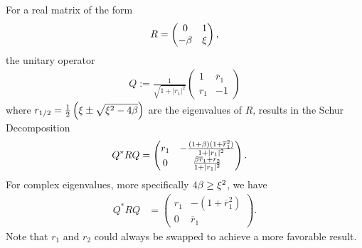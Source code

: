 \begin{lemma}
	For a real matrix of the form
	\begin{align*}
		R = \begin{pmatrix}
			0 & 1 \\
			-\beta & \xi
		\end{pmatrix},
	\end{align*}
	the unitary operator	
	\begin{align*}
		Q:=\frac{1}{\sqrt{1+|r_1|^2}} \begin{pmatrix}
		1 & \overline{r}_1 \\
		r_1 & -1
	\end{pmatrix}
	\end{align*}
	where
	\(
		r_{1/2}
		= \tfrac12 \left(
			\xi \pm \sqrt{\xi^2 - 4\beta}
		\right)
	\)
	are the eigenvalues of \(R\), results in the Schur Decomposition
	\begin{align*}
		Q^* R Q
		&=\begin{pmatrix}
			r_1
			& -\frac{(1+\beta)(1+\overline{r}_1^2)}{1+|r_1|^2} \\
			0 &  \frac{\beta\overline{r}_1 + r_2}{1+|r_1|^2}
		\end{pmatrix}.
	\end{align*}
	For complex eigenvalues, more specifically \(4\beta\ge\xi^2\), we have
	\begin{align*}
		Q^* R Q
		&=\begin{pmatrix}
			r_1
			& -(1+\overline{r}_1^2) \\
			0 & \overline{r}_1 
		\end{pmatrix}.
	\end{align*}
	Note that \(r_1\) and \(r_2\) could always be swapped to achieve a more favorable result.
\end{lemma}
